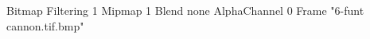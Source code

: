 {Bitmap
	{Filtering 1}
	{Mipmap 1}
	{Blend none}
	{AlphaChannel 0}
	{Frame "6-funt cannon.tif.bmp"}
}
